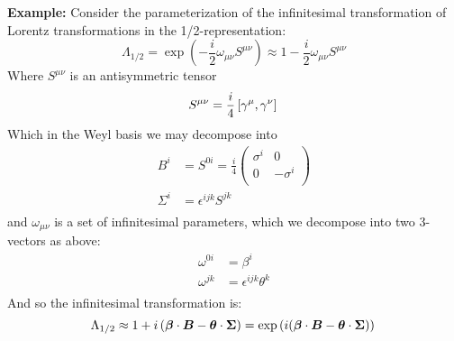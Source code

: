 \documentclass[12pt]{article}
\theoremstyle{definition}
\begin{document}
\textbf{Example:} Consider the parameterization of the infinitesimal transformation of Lorentz transformations
in the 1/2-representation:
\begin{equation*}
    \Lambda_{1/2} = \exp\left( -\frac{i}{2} \omega_{\mu\nu} S^{\mu\nu} \right) \approx 1 - \frac{i}{2} \omega_{\mu\nu} S^{\mu\nu} 
\end{equation*}
Where $S^{\mu\nu}$ is an antisymmetric tensor
\begin{equation*}
    S^{\mu\nu} = \frac{i}{4} \left[ \gamma^\mu, \gamma^\nu \right] \\
\end{equation*}
Which in the Weyl basis we may decompose into
\begin{equation*}
\begin{split}
    B^i &= S^{0i} = \frac{i}{4}
        \begin{pmatrix}
            \sigma^i & 0 \\
            0 & -\sigma^i \\
        \end{pmatrix} \\
    \Sigma^i &= \epsilon^{ijk} S^{jk} \\
\end{split}
\end{equation*}
and $\omega_{\mu\nu}$ is a set of infinitesimal parameters, which we decompose into two 3-vectors as above:
\begin{equation*}
\begin{split}
    \omega^{0i} &= \beta^i \\
    \omega^{jk} &= \epsilon^{ijk} \theta^k \\
\end{split}
\end{equation*}
And so the infinitesimal transformation is:
\begin{equation*}
    \Lambda_{1/2} \approx 1 + i \left( \bm{\beta} \cdot \bm{B} - \bm{\theta} \cdot \bm{\Sigma} \right)
        = \exp \left( i(\bm{\beta} \cdot \bm{B} - \bm{\theta} \cdot \bm{\Sigma}) \right) \\
\end{equation*}
\end{document}
